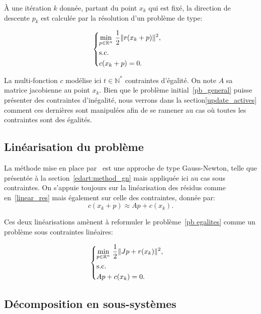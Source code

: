 \`A une itération $k$ donnée, partant du point $x_k$ qui est fixé, la direction de descente $p_k$ est calculée par la résolution d'un problème de type:

\begin{equation} \label{pb egalites}
    \left\{ \begin{aligned}
      &\underset{p \in \mathbb{R}^n}{\min}\ \dfrac{1}{2}\|r(x_k+p)\|^2, & \\ 
      &\textnormal{s.c.}  \\
      &c(x_k+p) = 0. \\
    \end{aligned} \right. 
\end{equation}

La multi-fonction $c$ modélise ici $t\in\mathbb{N}^*$ contraintes d'égalité. On note $A$ sa matrice jacobienne au point $x_k$.
Bien que le problème initial~\eqref{pb_general} puisse présenter des contraintes d'inégalité, nous verrons dans la section\ref{update_actives} comment ces dernières sont manipulées
afin de se ramener au cas où toutes les contraintes sont des égalités.

\subsection{Linéarisation du problème}\label{linearisation_gn}

La méthode mise en place par~\citet{lindwedin88} est une approche de type Gauss-Newton, telle que présentée à la section~\ref{edart:method_gn} mais appliquée ici au cas 
sous contraintes. On s'appuie toujours sur la linéarisation des résidus comme en~\eqref{linear_res} mais également
sur celle des contraintes, donnée par:
\[c(x_k+p) \approx Ap+c(x_k).\]

Ces deux linéarisations amènent à reformuler le problème~\eqref{pb egalites} comme un problème sous contraintes linéaires:

\begin{equation} \label{pb egalites linearise}
    \left\{ \begin{aligned}
      &\underset{p \in \mathbb{R}^n}{\min}\ \dfrac{1}{2}\|Jp+r(x_k)\|^2, & \\ 
      &\textnormal{s.c.}  \\
      &Ap+c(x_k) = 0. \\
    \end{aligned} \right. 
\end{equation}

\subsection{Décomposition en sous-systèmes}

